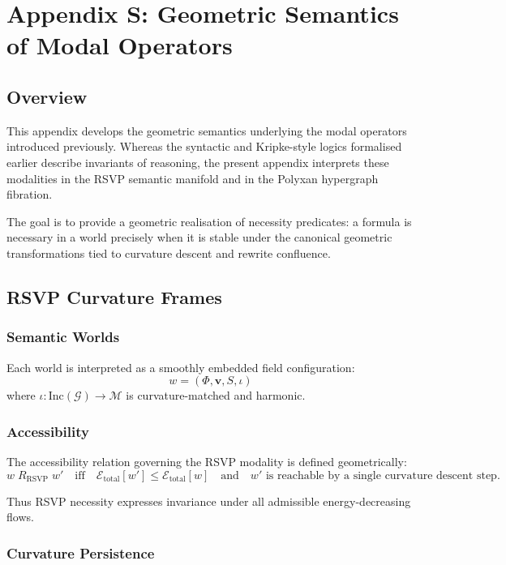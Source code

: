 \chapter*{Appendix S: Geometric Semantics of Modal Operators}

\section{Overview}

This appendix develops the geometric semantics underlying the modal operators introduced previously. Whereas the syntactic and Kripke-style logics formalised earlier describe invariants of reasoning, the present appendix interprets these modalities in the RSVP semantic manifold and in the Polyxan hypergraph fibration.  

The goal is to provide a geometric realisation of necessity predicates: a formula is necessary in a world precisely when it is stable under the canonical geometric transformations tied to curvature descent and rewrite confluence.

\section{RSVP Curvature Frames}

\subsection{Semantic Worlds}

Each world is interpreted as a smoothly embedded field configuration:
\[
w = (\Phi,\mathbf{v},S,\iota)
\]
where $\iota : \mathrm{Inc}(\mathcal{G}) \to \mathcal{M}$ is curvature-matched and harmonic.

\subsection{Accessibility}

The accessibility relation governing the RSVP modality is defined geometrically:
\[
w \;R_{\mathrm{RSVP}}\; w'
\quad\text{iff}\quad
\mathcal{E}_{\mathrm{total}}[w'] \leq \mathcal{E}_{\mathrm{total}}[w]
\quad\text{and}\quad
w' \text{ is reachable by a single curvature descent step.}
\]

Thus RSVP necessity expresses invariance under all admissible energy-decreasing flows.

\subsection{Curvature Persistence}

